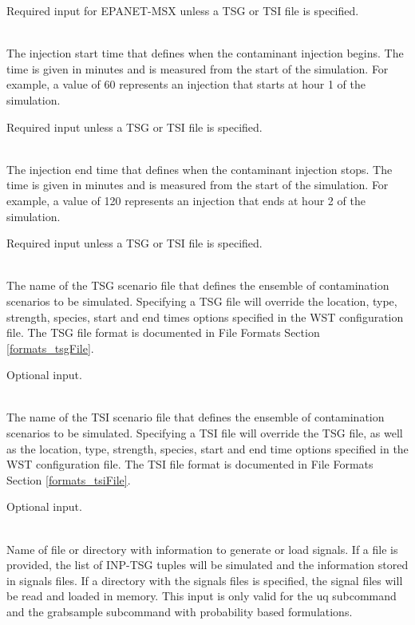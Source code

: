 \begin{description}[topsep=0pt,parsep=0.5em,itemsep=-0.4em]
\begin{description}[topsep=0pt,parsep=0.5em,itemsep=-0.4em]
                Required input for EPANET-MSX unless a TSG or TSI file is specified.
    \item[{start time}]\hfill
\\The injection start time that defines when the contaminant injection begins. 
                The time is given in minutes and is measured from the start of the simulation. 
                For example, a value of 60 represents an injection that starts at hour 1 of the simulation.
                
                Required input unless a TSG or TSI file is specified.
    \item[{end time}]\hfill
\\The injection end time that defines when the contaminant injection stops.				
                The time is given in minutes and is measured from the start of the simulation.
                For example, a value of 120 represents an injection that ends at hour 2 of the simulation.
                
                Required input unless a TSG or TSI file is specified.
    \item[{tsg file}]\hfill
\\The name of the TSG scenario file that defines the ensemble of contamination
                scenarios to be simulated. Specifying a TSG file will
                override the location, type, strength, species, start and end times options specified in
                the WST configuration file. The TSG file format is documented in File Formats Section \ref{formats_tsgFile}.
                
                Optional input.
    \item[{tsi file}]\hfill
\\The name of the TSI scenario file that defines the ensemble of contamination
                scenarios to be simulated. Specifying a TSI file will
                override the TSG file, as well as the location, type, strength, species, start and end time options specified in
                the WST configuration file. The TSI file format is documented in File Formats Section \ref{formats_tsiFile}.
                
                Optional input.
    \item[{signals}]\hfill
\\Name of file or directory with information to generate 
                or load signals. If a file is provided, the list of INP-TSG tuples
                 will be simulated and the information stored in signals files. If
                a directory with the signals files is specified, the signal files will
                be read and loaded in memory. This input is only valid for the uq
                subcommand and the grabsample subcommand with probability based formulations.


\end{description}
\end{description}

